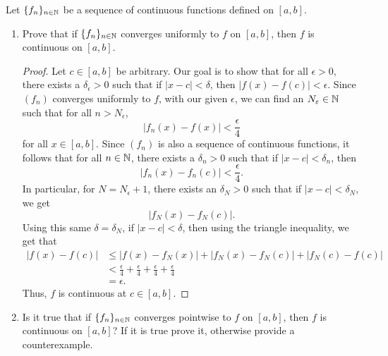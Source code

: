 \documentclass[a4paper]{article}
\begin{document}
\begin{problem}
    Let \( \{ {f}_{n} \}_{n \in \mathbb{N}} \) be a sequence of continuous functions defined on \( [a,b] \).
    \begin{enumerate}
        \item[(a)] Prove that if \( \{ {f}_{n} \}_{n \in \mathbb{N}} \) converges uniformly to \( f  \) on \( [a,b] \), then \( f  \) is continuous on \( [a,b] \).
            \begin{proof}
                Let \( c \in [a,b] \) be arbitrary. Our goal is to show that for all \( \epsilon > 0  \), there exists a \( {\delta}_{\epsilon} > 0  \) such that if \( | x - c  |  < \delta  \), then \( | f(x) -f (c)  |  < \epsilon \). Since \( ({f}_{n}) \) converges uniformly to \( f  \), with our given \( \epsilon  \), we can find an \( {N}_{\varepsilon} \in \mathbb{N}  \) such that for all \( n > {N}_{\epsilon} \),
                \[  | {f}_{n}(x) - f(x)  |  < \frac{ \epsilon }{  4  }   \]
                for all \( x \in [a,b] \). Since \( ({f}_{n}) \) is also a sequence of continuous functions, it follows that for all \( n \in \mathbb{N} \), there exists a \( \delta_{n} > 0  \) such that if \( | x - c  |  < \delta_n  \), then
                \[  | {f}_{n}(x) - {f}_{n}(c) |  < \frac{ \epsilon }{ 4 }.  \]
                In particular, for \( N = {N}_{\epsilon} + 1  \), there exists an \( {\delta}_{N} > 0  \) such that if \( | x - c  |  < {\delta}_{N} \), we get 
                \[  | {f}_{N}(x) - {f}_{N}(c) |. \]
                Using this same \( \delta = {\delta}_{N} \), if \( | x - c  |  < \delta \), then using the triangle inequality, we get that 
                \begin{align*}
                    | f(x) - f(c) | &\leq | f(x) - {f}_{N}(x)  | + | {f}_{N}(x) - {f}_{N}(c) |  + | {f}_{N}(c) - f(c) |   \\
                                    &< \frac{ \epsilon }{ 4  }  + \frac{ \epsilon }{ 4 }  + \frac{ \epsilon }{ 4 }  + \frac{ \epsilon }{ 4 } \\
                                    &=\epsilon.
                \end{align*}
                Thus, \( f  \) is continuous at \( c \in [a,b] \).
            \end{proof}
        \item[(b)] Is it true that if \( \{ {f}_{n} \}_{n  \in \mathbb{N}} \) converges pointwise to \( f  \) on \( [a,b] \), then \( f  \) is continuous on \( [a,b] \)? If it is true prove it, otherwise provide a counterexample.
            \begin{solution}

\end{solution}
\end{enumerate}
\end{problem}
\end{document}
